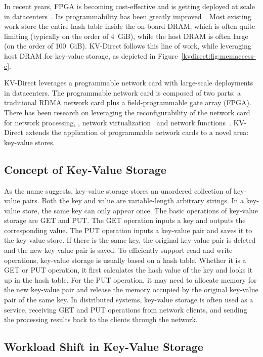{{In recent years, FPGA is becoming cost-effective and is getting deployed at scale in datacenters~\cite{putnam2014programmable, caulfield2016cloud}. Its programmability has been greatly improved~\cite{li2016clicknp}.
Most existing work store the entire hash table inside the on-board DRAM, which is often quite limiting (typically on the order of 4~GiB), while the host DRAM is often large (on the order of 100~GiB).
KV-Direct follows this line of work, while leveraging host DRAM for key-value storage, as depicted in Figure~\ref{kvdirect:fig:memaccess-c}.

KV-Direct leverages a programmable network card with large-scale deployments in datacenters.
The programmable network card is composed of two parts: a traditional RDMA network card plus a field-programmable gate array (FPGA).
There has been research on leveraging the reconfigurability of the network card for network processing, \eg, network virtualization~\cite{greenberg2015sdn, vfp} and network functions~\cite{li2016clicknp}.
KV-Direct extends the application of programmable network cards to a novel area: key-value stores.

\subsection{Concept of Key-Value Storage}
\label{kvdirect:sec:kvs}

As the name suggests, key-value storage stores an unordered collection of key-value pairs. Both the key and value are variable-length arbitrary strings. In a key-value store, the same key can only appear once. The basic operations of key-value storage are GET and PUT. The GET operation inputs a key and outputs the corresponding value. The PUT operation inputs a key-value pair and saves it to the key-value store. If there is the same key, the original key-value pair is deleted and the new key-value pair is saved.
To efficiently support read and write operations, key-value storage is usually based on a hash table. Whether it is a GET or PUT operation, it first calculates the hash value of the key and looks it up in the hash table. For the PUT operation, it may need to allocate memory for the new key-value pair and release the memory occupied by the original key-value pair of the same key.
In distributed systems, key-value storage is often used as a service, receiving GET and PUT operations from network clients, and sending the processing results back to the clients through the network.

\subsection{Workload Shift in Key-Value Storage}
\label{kvdirect:sec:workload-shift}

}}
